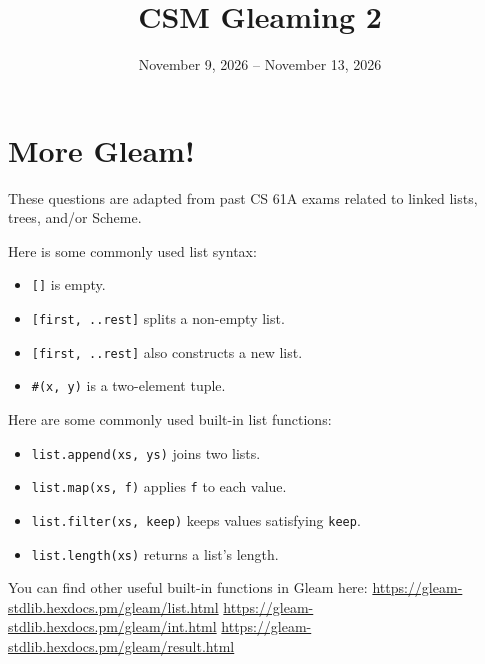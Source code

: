 \documentclass{exam}
\title{CSM Gleaming 2}
\date{November 9, 2026 -- November 13, 2026}
\begin{document}
\maketitle

\section{More Gleam!}
\begin{blocksection}
\end{blocksection}\par
{\setlength{\leftskip}{0.7em}
\noindent These questions are adapted from past CS 61A exams related to linked lists, trees, and/or Scheme.

\par\vspace{\baselineskip}
\noindent Here is some commonly used list syntax:
\begin{itemize}
  \item \lstinline|[]| is empty.
  \item \lstinline|[first, ..rest]| splits a non-empty list.
  \item \lstinline|[first, ..rest]| also constructs a new list.
  \item \lstinline|#(x, y)| is a two-element tuple.
\end{itemize}

\vspace{\baselineskip}
\noindent Here are some commonly used built-in list functions:
\begin{itemize}
  \item \lstinline{list.append(xs, ys)} joins two lists.
  \item \lstinline{list.map(xs, f)} applies \texttt{f} to each value.
  \item \lstinline{list.filter(xs, keep)} keeps values satisfying \texttt{keep}.
  \item \lstinline{list.length(xs)} returns a list's length.
\end{itemize}

\vspace{\baselineskip}
\noindent You can find other useful built-in functions in Gleam here:\newline
\url{https://gleam-stdlib.hexdocs.pm/gleam/list.html}\newline
\url{https://gleam-stdlib.hexdocs.pm/gleam/int.html}\newline
\url{https://gleam-stdlib.hexdocs.pm/gleam/result.html}
\par}
\vspace{\baselineskip}
\end{document}
